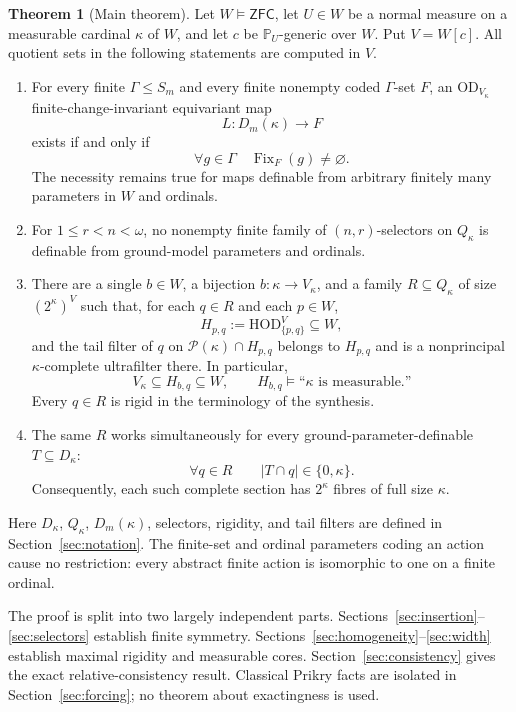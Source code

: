 \documentclass[11pt,letterpaper]{article}
\theoremstyle{definition}
\newtheorem{theorem}[definition]{Theorem}
\numberwithin{equation}{section}
\newcommand{\ZFC}{\mathsf{ZFC}}
\newcommand{\HOD}{\mathrm{HOD}}
\newcommand{\OD}{\mathrm{OD}}
\newcommand{\Pow}{\mathcal P}
\newcommand{\PP}{\mathbb P}
\newcommand{\Fix}{\operatorname{Fix}}
\begin{document}
\begin{theorem}[Main theorem]\label{thm:main}
Let $W\models\ZFC$, let $U\in W$ be a normal measure on a measurable cardinal $\kappa$ of $W$, and let $c$ be $\PP_U$-generic over $W$. Put $V=W[c]$. All quotient sets in the following statements are computed in $V$.
\begin{enumerate}
\item For every finite $\Gamma\le S_m$ and every finite nonempty coded $\Gamma$-set $F$, an $\OD_{V_\kappa}$ finite-change-invariant equivariant map
\[
L:D_m(\kappa)\longrightarrow F
\]
exists if and only if
\begin{equation}\label{eq:criterion}
\forall g\in\Gamma\quad \Fix_F(g)\ne\varnothing.
\end{equation}
The necessity remains true for maps definable from arbitrary finitely many parameters in $W$ and ordinals.
\item For $1\le r<n<\omega$, no nonempty finite family of $(n,r)$-selectors on $Q_\kappa$ is definable from ground-model parameters and ordinals.
\item There are a single $b\in W$, a bijection $b:\kappa\to V_\kappa$, and a family $R\subseteq Q_\kappa$ of size $(2^\kappa)^V$ such that, for each $q\in R$ and each $p\in W$,
\[
H_{p,q}:=\HOD_{\{p,q\}}^V\subseteq W,
\]
and the tail filter of $q$ on $\Pow(\kappa)\cap H_{p,q}$ belongs to $H_{p,q}$ and is a nonprincipal $\kappa$-complete ultrafilter there. In particular,
\[
V_\kappa\subseteq H_{b,q}\subseteq W,
\qquad H_{b,q}\models\text{``$\kappa$ is measurable.''}
\]
Every $q\in R$ is rigid in the terminology of the synthesis.
\item The same $R$ works simultaneously for every ground-parameter-definable $T\subseteq D_\kappa$:
\[
\forall q\in R\qquad |T\cap q|\in\{0,\kappa\}.
\]
Consequently, each such complete section has $2^\kappa$ fibres of full size $\kappa$.
\end{enumerate}
\end{theorem}

Here $D_\kappa$, $Q_\kappa$, $D_m(\kappa)$, selectors, rigidity, and tail filters are defined in Section~\ref{sec:notation}. The finite-set and ordinal parameters coding an action cause no restriction: every abstract finite action is isomorphic to one on a finite ordinal.

The proof is split into two largely independent parts. Sections~\ref{sec:insertion}--\ref{sec:selectors} establish finite symmetry. Sections~\ref{sec:homogeneity}--\ref{sec:width} establish maximal rigidity and measurable cores. Section~\ref{sec:consistency} gives the exact relative-consistency result. Classical Prikry facts are isolated in Section~\ref{sec:forcing}; no theorem about exactingness is used.
\end{document}
